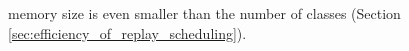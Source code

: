 \begin{itemize}[topsep=1pt,]
    memory size is even smaller than the number of classes (Section \ref{sec:efficiency_of_replay_scheduling}). 
\end{itemize}





